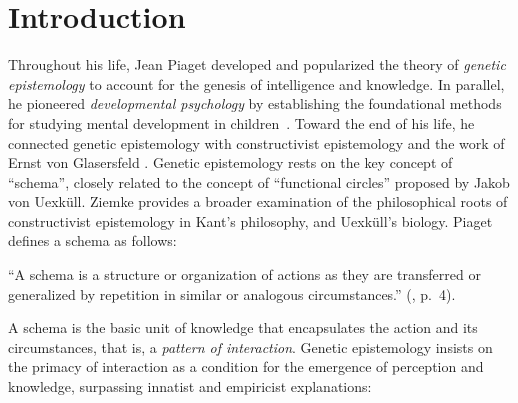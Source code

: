 \documentclass[runningheads]{llncs}
\begin{document}
\section{Introduction}
\label{sec:intro}
%
Throughout his life, Jean Piaget developed and popularized the theory of \textit{genetic epistemology} \cite{piaget_principles_1997}  to account for the genesis of intelligence and knowledge. 
In parallel, he pioneered \textit{developmental psychology} by establishing the foundational methods for studying mental development in children~\cite{piaget_origins_1955,piaget_reality_1955}.
Toward the end of his life, he connected genetic epistemology with constructivist epistemology and the work of Ernst von Glasersfeld \cite{glasersfeld_radical_1997}. 
Genetic epistemology rests on the key concept of ``schema'', closely related to the concept of ``functional circles'' proposed by Jakob von Uexküll.
Ziemke \cite{ziemke_construction_2001} provides a broader examination of the philosophical roots of constructivist epistemology in Kant's philosophy, and Uexküll's biology.  
Piaget defines a schema as follows: 
\\

\begin{adjustwidth}{1cm}{1cm}
``A schema is a structure or organization of actions as they are transferred or generalized by repetition in similar or analogous circumstances.''
(\cite{piaget_psychology_1969}, p.~4).
\\ 
\end{adjustwidth}

A schema is the basic unit of knowledge that encapsulates the action and its circumstances, that is, a \textit{pattern of interaction}. 
Genetic epistemology insists on the primacy of interaction as a condition for the emergence of perception and knowledge, 
surpassing innatist and empiricist explanations:
\\
\end{document}
